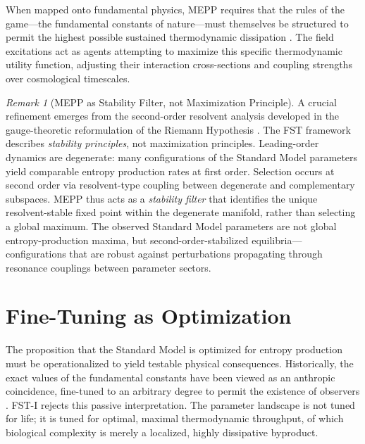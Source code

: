 \documentclass[12pt,a4paper]{article}
\theoremstyle{remark}
\newtheorem{remark}{Remark}
\begin{document}
When mapped onto fundamental physics, MEPP requires that the rules of the game---the fundamental constants of nature---must themselves be structured to permit the highest possible sustained thermodynamic dissipation \citep{EntropyMaximum}. The field excitations act as agents attempting to maximize this specific thermodynamic utility function, adjusting their interaction cross-sections and coupling strengths over cosmological timescales.

\begin{remark}[MEPP as Stability Filter, not Maximization Principle]
\label{rem:mepp-stability-filter}
A crucial refinement emerges from the second-order resolvent analysis developed in the gauge-theoretic reformulation of the Riemann Hypothesis \citep{GeigerRH2026b}. The FST framework describes \emph{stability principles}, not maximization principles. Leading-order dynamics are degenerate: many configurations of the Standard Model parameters yield comparable entropy production rates at first order. Selection occurs at second order via resolvent-type coupling between degenerate and complementary subspaces. MEPP thus acts as a \emph{stability filter} that identifies the unique resolvent-stable fixed point within the degenerate manifold, rather than selecting a global maximum. The observed Standard Model parameters are not global entropy-production maxima, but second-order-stabilized equilibria---configurations that are robust against perturbations propagating through resonance couplings between parameter sectors.
\end{remark}

\section{Fine-Tuning as Optimization}
\label{sec:finetuning}

The proposition that the Standard Model is optimized for entropy production must be operationalized to yield testable physical consequences. Historically, the exact values of the fundamental constants have been viewed as an anthropic coincidence, fine-tuned to an arbitrary degree to permit the existence of observers \citep{Adams2019}. FST-I rejects this passive interpretation. The parameter landscape is not tuned for life; it is tuned for optimal, maximal thermodynamic throughput, of which biological complexity is merely a localized, highly dissipative byproduct.
\end{document}
